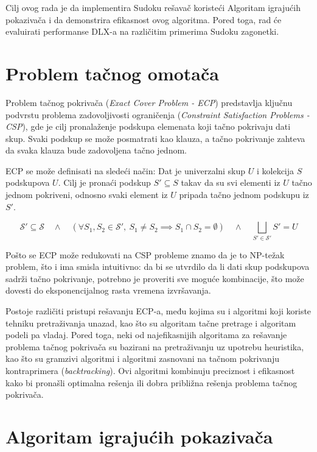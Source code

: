 \documentclass[a4paper]{article}
\begin{document}
{Cilj ovog rada je da implementira Sudoku rešavač koristeći Algoritam igrajućih pokazivača i da
demonstrira efikasnost ovog algoritma. Pored toga, rad će evaluirati performanse DLX-a na
različitim primerima Sudoku zagonetki.

\section{Problem tačnog omotača}

Problem tačnog pokrivača ({\em Exact Cover Problem - ECP}) predstavlja ključnu podvrstu problema
zadovoljivosti ograničenja ({\em Constraint Satisfaction Problems - CSP}), gde je cilj
pronalaženje podskupa elemenata koji tačno pokrivaju dati skup. Svaki podskup se može posmatrati
kao klauza, a tačno pokrivanje zahteva da svaka klauza bude zadovoljena tačno jednom.

ECP se može definisati na sledeći način: Dat je univerzalni skup \( U \)
i kolekcija \( S \) podskupova \( U \). Cilj je pronaći podskup \( S' \subseteq S \) takav
da su svi elementi iz \( U \) tačno jednom pokriveni, odnosno svaki element iz \( U \) pripada
tačno jednom podskupu iz \( S' \).

\[
\mathcal{S}' \subseteq \mathcal{S} \quad \wedge \quad \left( \forall S_1, S_2 \in \mathcal{S}', \ S_1 \neq S_2 \implies S_1 \cap S_2 = \emptyset \right) \quad \wedge \quad \bigsqcup_{S' \in \mathcal{S}'} S' = U
\]

Pošto se ECP može redukovati na CSP probleme \cite{reduction} znamo da je to NP-težak problem,
što i ima smisla intuitivno: da bi se utvrdilo da li dati skup podskupova sadrži tačno pokrivanje,
potrebno je proveriti sve moguće kombinacije, što može dovesti do eksponencijalnog rasta vremena izvršavanja.

Postoje različiti pristupi rešavanju ECP-a, među kojima su i algoritmi koji koriste tehniku pretraživanja
unazad, kao što su algoritam tačne pretrage i algoritam podeli pa vladaj. Pored toga, neki od najefikasnijih
algoritama za rešavanje problema tačnog pokrivača su bazirani na pretraživanju uz upotrebu heuristika, kao
što su gramzivi algoritmi i algoritmi zasnovani na tačnom pokrivanju kontraprimera ({\em backtracking}).
Ovi algoritmi kombinuju preciznost i efikasnost kako bi pronašli optimalna rešenja ili dobra približna rešenja
problema tačnog pokrivača.

\section{Algoritam igrajućih pokazivača}

}
\end{document}
